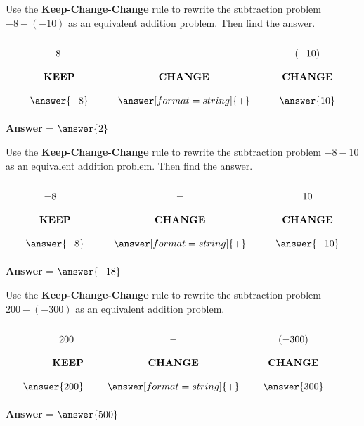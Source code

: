 \documentclass{ximera}[font=12pt]
\begin{document}
\begin{problem} 
    Use the \textbf{Keep-Change-Change} rule to rewrite the subtraction problem $-8 -(-10)$ as an equivalent addition problem. Then find the answer.

    \[ 
    \renewcommand{\arraystretch}{2} 
    \begin{array}{c @{\hskip 30pt} c @{\hskip 30pt} c} 
    -8 \quad & - & (-10) \\ 
    \textbf{KEEP} & \textbf{CHANGE} & \textbf{CHANGE} \\ 
    \answer{-8} & \answer[format=string]{+}   & \answer{10} 
    \end{array} 
    \] 

    \textcolor{orange!80!black}{\textbf{Answer}} = $\answer{2}$ 
\end{problem}


\begin{problem} Use the \textbf{Keep-Change-Change} rule to rewrite the subtraction problem $-8-10$ as an 
equivalent addition problem. Then find the answer.

\[ 
\renewcommand{\arraystretch}{2} 
\begin{array}{c @{\hskip 30pt} c @{\hskip 30pt} c} 
-8 \quad & - & 10 \\ 
\textbf{KEEP} & \textbf{CHANGE} & \textbf{CHANGE} \\ 
\answer{-8} & \answer[format=string]{+}   & \answer{-10} 
\end{array} 
\] 

\textcolor{orange!80!black}{\textbf{Answer}} = $\answer{-18}$ 
\end{problem}


\begin{problem}
    Use the \textbf{Keep-Change-Change} rule to rewrite the subtraction problem $200 -(-300)$ as an equivalent 
    addition problem.  

    \[
    \renewcommand{\arraystretch}{2}
    \begin{array}{r @{\hskip 24pt} c @{\hskip 24pt} c @{\hskip 24pt} c}
    200 \quad & - & (-300) \\
    \textbf{KEEP} & \textbf{CHANGE} & \textbf{CHANGE} \\
    \answer{200} & \answer[format=string]{+} & \answer{300}
    \end{array}
    \]

\textcolor{orange!80!black}{\textbf{Answer}} = $\answer{500}$
                                                   
\end{problem}    
\end{document}

